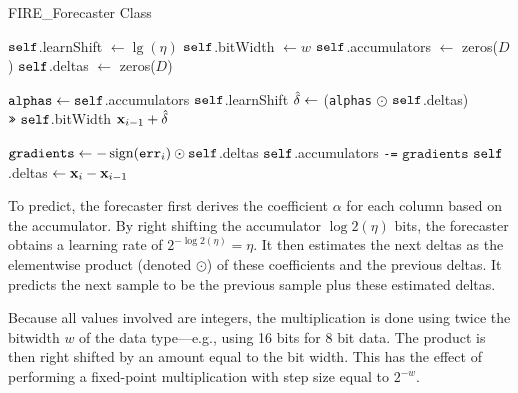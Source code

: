 
\begin{algorithm}[h]
\caption{FIRE\_Forecaster Class} \label{algo:xff}
\begin{algorithmic}[1]

 \label{line:xffCtor}
\State $\texttt{self}$.learnShift $\leftarrow \lg(\eta)$
\State $\texttt{self}$.bitWidth $\leftarrow w$ 
\State $\texttt{self}$.accumulators $\leftarrow $ zeros($D$) \label{line:counter}
\State $\texttt{self}$.deltas $\leftarrow $ zeros($D$) \label{line:deltas}
\EndFunction

 \label{line:xffPredict}
\State $\texttt{alphas} \leftarrow \texttt{self}$.accumulators \rshift $\texttt{self}$.learnShift
\State $\hat{\mathbf{\delta}} \leftarrow$ (\texttt{alphas} $\odot$ $\texttt{self}$.deltas) $\texttt{>>}\text{ } \texttt{self}$.bitWidth
\RETURN $\mathbf{x}_{i-1} + \hat{\mathbf{\delta}}$
\EndFunction

 \label{line:xffTrain}
\State $\texttt{gradients} \leftarrow {-\operatorname{sign}(\texttt{err}_i)} \odot \texttt{self}$.deltas
\State $\texttt{self}$.accumulators \texttt{-=} $\texttt{gradients}$
\State $\texttt{self}$.deltas $\leftarrow \mathbf{x}_{i} - \mathbf{x}_{i-1}$
\EndFunction

\end{algorithmic}
\end{algorithm}


To predict, the forecaster first derives the coefficient $\alpha$ for each column based on the accumulator. By right shifting the accumulator $\log2(\eta)$ bits, the forecaster obtains a learning rate of $2^{-\log2(\eta)} = \eta$. It then estimates the next deltas as the elementwise product (denoted $\odot$) of these coefficients and the previous deltas. It predicts the next sample to be the previous sample plus these estimated deltas.

Because all values involved are integers, the multiplication is done using twice the bitwidth $w$ of the data type---e.g., using 16 bits for 8 bit data. The product is then right shifted by an amount equal to the bit width. This has the effect of performing a fixed-point multiplication with step size equal to $2^{-w}$.

